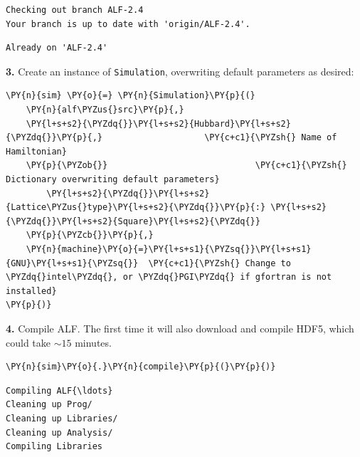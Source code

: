     \begin{Verbatim}[commandchars=\\\{\}]
Checking out branch ALF-2.4
Your branch is up to date with 'origin/ALF-2.4'.
    \end{Verbatim}

    \begin{Verbatim}[commandchars=\\\{\}]
Already on 'ALF-2.4'
    \end{Verbatim}

    \textbf{3.} Create an instance of \texttt{Simulation}, overwriting
default parameters as desired:

    \begin{tcolorbox}[breakable, size=fbox, boxrule=1pt, pad at break*=1mm,colback=cellbackground, colframe=cellborder]
\begin{Verbatim}[commandchars=\\\{\}]
\PY{n}{sim} \PY{o}{=} \PY{n}{Simulation}\PY{p}{(}
    \PY{n}{alf\PYZus{}src}\PY{p}{,}
    \PY{l+s+s2}{\PYZdq{}}\PY{l+s+s2}{Hubbard}\PY{l+s+s2}{\PYZdq{}}\PY{p}{,}                    \PY{c+c1}{\PYZsh{} Name of Hamiltonian}
    \PY{p}{\PYZob{}}                             \PY{c+c1}{\PYZsh{} Dictionary overwriting default parameters}
        \PY{l+s+s2}{\PYZdq{}}\PY{l+s+s2}{Lattice\PYZus{}type}\PY{l+s+s2}{\PYZdq{}}\PY{p}{:} \PY{l+s+s2}{\PYZdq{}}\PY{l+s+s2}{Square}\PY{l+s+s2}{\PYZdq{}}
    \PY{p}{\PYZcb{}}\PY{p}{,}
    \PY{n}{machine}\PY{o}{=}\PY{l+s+s1}{\PYZsq{}}\PY{l+s+s1}{GNU}\PY{l+s+s1}{\PYZsq{}}  \PY{c+c1}{\PYZsh{} Change to \PYZdq{}intel\PYZdq{}, or \PYZdq{}PGI\PYZdq{} if gfortran is not installed}
\PY{p}{)}
\end{Verbatim}
\end{tcolorbox}

    \textbf{4.} Compile ALF. The first time it will also download and
compile HDF5, which could take \(\sim15\) minutes.

    \begin{tcolorbox}[breakable, size=fbox, boxrule=1pt, pad at break*=1mm,colback=cellbackground, colframe=cellborder]
\begin{Verbatim}[commandchars=\\\{\}]
\PY{n}{sim}\PY{o}{.}\PY{n}{compile}\PY{p}{(}\PY{p}{)}
\end{Verbatim}
\end{tcolorbox}

    \begin{Verbatim}[commandchars=\\\{\}]
Compiling ALF{\ldots}
Cleaning up Prog/
Cleaning up Libraries/
Cleaning up Analysis/
Compiling Libraries
    \end{Verbatim}

